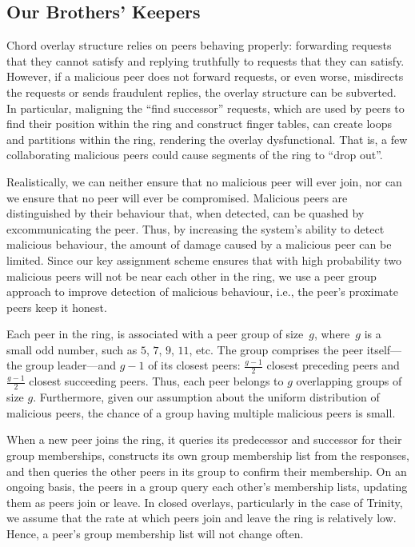 \documentclass[11pt]{article}
\begin{document}
\subsection{Our Brothers' Keepers}
Chord overlay structure relies on peers behaving properly: forwarding
requests that they cannot satisfy and replying truthfully to requests
that they can satisfy.  However, if a malicious peer does not forward
requests, or even worse, misdirects the requests or sends fraudulent
replies, the overlay structure can be subverted.  In particular,
maligning the ``find successor'' requests, which are used by peers
to find their position within the ring and construct finger tables,
can create loops and partitions within the ring, rendering the
overlay dysfunctional.  That is, a few collaborating malicious peers
could cause segments of the ring to ``drop out''.

Realistically, we can neither ensure that no malicious peer will
ever join, nor can we ensure that no peer will ever be compromised.
Malicious peers are distinguished by their behaviour that, when
detected, can be quashed by excommunicating the peer.  Thus, by
increasing the system's ability to detect malicious behaviour, the
amount of damage caused by a malicious peer can be limited.  Since
our key assignment scheme ensures that with high probability two
malicious peers will not be near each other in the ring, we use a
peer group approach to improve detection of malicious behaviour,
i.e., the peer's proximate peers keep it honest.

Each peer in the ring, is associated with a peer group of size~$g$,
where~$g$ is a small odd number, such as $5$, $7$, $9$, $11$, etc.
The group comprises the peer itself---the group leader---and $g -
1$ of its closest peers: $\frac{g - 1}{2}$ closest preceding peers
and $\frac{g - 1}{2}$ closest succeeding peers.  Thus, each peer
belongs to $g$ overlapping groups of size $g$.   Furthermore, given
our assumption about the uniform distribution of malicious peers,
the chance of a group having multiple malicious peers is small.

When a new peer joins the ring, it queries its predecessor and
successor for their group memberships, constructs its own group
membership list from the responses, and then queries the other peers
in its group to confirm their membership.  On an ongoing basis, the
peers in a group query each other's membership lists, updating them
as peers join or leave.  In closed overlays, particularly in the
case of Trinity, we assume that the rate at which peers join and
leave the ring is relatively low.  Hence, a peer's group membership
list will not change often.
\end{document}
